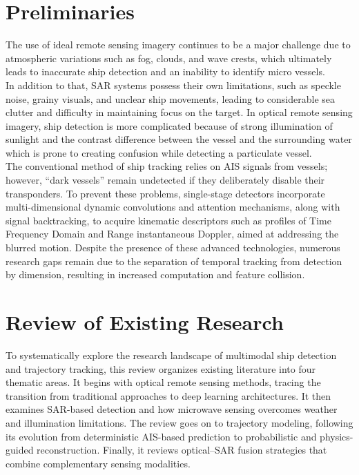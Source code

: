 \section{Preliminaries}

The use of ideal remote sensing imagery continues to be a major challenge due to atmospheric variations such as fog, clouds, and wave crests, which ultimately leads to inaccurate ship detection and an inability to identify micro vessels. \\

In addition to that, SAR systems possess their own limitations, such as speckle noise, grainy visuals, and unclear ship movements, leading to considerable sea clutter and difficulty in maintaining focus on the target. In optical remote sensing imagery, ship detection is more complicated because of strong illumination of sunlight and the contrast difference between the vessel and the surrounding water which is prone to creating confusion while detecting a particulate vessel. \\

The conventional method of ship tracking relies on AIS signals from vessels; however, “dark vessels” remain undetected if they deliberately disable their transponders. To prevent these problems, single-stage detectors incorporate multi-dimensional dynamic convolutions and attention mechanisms, along with signal backtracking, to acquire kinematic descriptors such as profiles of Time Frequency Domain  and Range instantaneous Doppler, aimed at addressing the blurred motion. Despite the presence of these advanced technologies, numerous research gaps remain due to the separation of temporal tracking from detection by dimension, resulting in increased computation and feature collision.\\


\section{Review of Existing Research}
To systematically explore the research landscape of multimodal ship detection and trajectory tracking, this review organizes existing literature into four thematic areas. It begins with optical remote sensing methods, tracing the transition from traditional approaches to deep learning architectures. It then examines SAR-based detection and how microwave sensing overcomes weather and illumination limitations. The review goes on to trajectory modeling, following its evolution from deterministic AIS-based prediction to probabilistic and physics-guided reconstruction. Finally, it reviews optical–SAR fusion strategies that combine complementary sensing modalities. 

